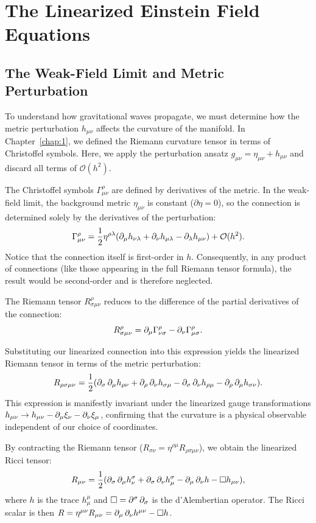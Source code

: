 \section{The Linearized Einstein Field Equations}
\label{sec:the_linearized_einstein_field_equations}

\subsection{The Weak-Field Limit and Metric Perturbation} To understand how gravitational waves propagate, we must determine how the metric perturbation $h_{\mu\nu}$ affects the curvature of the manifold. In Chapter~\ref{chap:1}, we defined the Riemann curvature tensor in terms of Christoffel symbols. Here, we apply the perturbation ansatz $g_{\mu\nu} = \eta_{\mu\nu} + h_{\mu\nu}$ and discard all terms of $\mathcal{O}(h^2)$.

The Christoffel symbols $\Gamma^{\rho}_{\mu\nu}$ are defined by derivatives of the metric. In the weak-field limit, the background metric $\eta_{\mu\nu}$ is constant ($\partial \eta = 0$), so the connection is determined solely by the derivatives of the perturbation:
\[%
  \Gamma^{\rho}_{\mu\nu} = \frac{1}{2}\eta^{\rho\lambda}(\pd{\mu}h_{\nu\lambda} + \pd{\nu}h_{\mu\lambda} - \pd{\lambda}h_{\mu\nu}) + \mathcal{O}(h^2)
.\]%
Notice that the connection itself is first-order in $h$. Consequently, in any product of connections (like those appearing in the full Riemann tensor formula), the result would be second-order and is therefore neglected.

The Riemann tensor $R^{\rho}_{\sigma\mu\nu}$ reduces to the difference of the partial derivatives of the connection:
\[%
  R^{\rho}_{\sigma\mu\nu} = \pd{\mu}\Gamma^{\rho}_{\nu\sigma} - \pd{\nu}\Gamma^{\rho}_{\mu\sigma}
.\]%

Substituting our linearized connection into this expression yields the linearized Riemann tensor in terms of the metric perturbation:
\[%
  R_{\rho\sigma\mu\nu} = \frac{1}{2}(\pd{\sigma}\pd{\mu}h_{\rho\nu} + \pd{\rho}\pd{\nu}h_{\sigma\mu} - \pd{\sigma}\pd{\nu}h_{\rho\mu} - \pd{\rho}\pd{\mu}h_{\sigma\nu})
.\]%
This expression is manifestly invariant under the linearized gauge transformations $h_{\mu\nu} \rightarrow h_{\mu\nu} - \pd{\mu}\xi_{\nu} - \pd{\nu}\xi_{\mu}$, confirming that the curvature is a physical observable independent of our choice of coordinates.

By contracting the Riemann tensor ($R_{\sigma\nu} = \eta^{\rho\mu}R_{\rho\sigma\mu\nu}$), we obtain the linearized Ricci tensor:
\[%
  R_{\mu\nu} = \frac{1}{2}(\pd{\sigma}\pd{\mu}h^{\sigma}_{\nu} + \pd{\sigma}\pd{\nu}h^{\sigma}_{\mu} - \pd{\mu}\pd{\nu}h - \Box h_{\mu\nu})
,\]%
where $h$ is the trace $h^{\mu}_{\mu}$ and $\Box = \partial^{\sigma}\pd{\sigma}$ is the d'Alembertian operator. The Ricci scalar is then $R = \eta^{\mu\nu}R_{\mu\nu} = \pd{\mu}\pd{\nu}h^{\mu\nu} - \Box h$.

